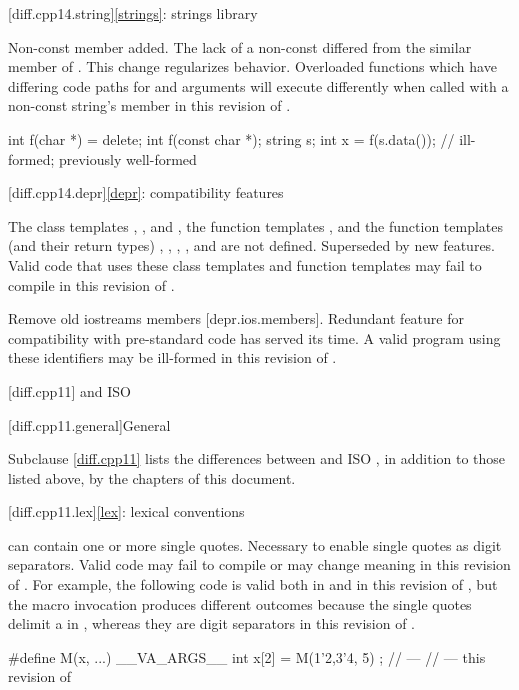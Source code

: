 [diff.cpp14.string]{\ref*{strings}: strings library}

\change
Non-const  member added.
\rationale
The lack of a non-const 
differed from the similar member of .
This change regularizes behavior.
\effect
Overloaded functions which have differing code paths
for  and  arguments
will execute differently
when called with a non-const string's  member
in this revision of \Cpp{}.
\begin{example}
\begin{codeblock}
int f(char *) = delete;
int f(const char *);
string s;
int x = f(s.data());            // ill-formed; previously well-formed
\end{codeblock}
\end{example}

[diff.cpp14.depr]{\ref*{depr}: compatibility features}

\nodiffref
\change
The class templates
,
, and
,
the function templates
,
and the function templates (and their return types)
,
,
,
, and
are not defined.
\rationale
Superseded by new features.
\effect
Valid \CppXIV{} code that uses these class templates
and function templates may fail to compile in this revision of \Cpp{}.

\nodiffref
\change
Remove old iostreams members [depr.ios.members].
\rationale
Redundant feature for compatibility with pre-standard code
has served its time.
\effect
A valid \CppXIV{} program using these identifiers
may be ill-formed in this revision of \Cpp{}.

[diff.cpp11]{\Cpp{} and ISO \CppXI{}}

[diff.cpp11.general]{General}

\pnum
{}%
Subclause \ref{diff.cpp11} lists the differences between \Cpp{} and
ISO \CppXI{},
in addition to those listed above,
by the chapters of this document.

[diff.cpp11.lex]{\ref*{lex}: lexical conventions}

\change
{} can contain one or more single quotes.
\rationale
Necessary to enable single quotes as digit separators.
\effect
Valid \CppXI{} code may fail to compile or may change meaning in this
revision of \Cpp{}. For example, the following code is valid both in \CppXI{} and in
this revision of \Cpp{}, but the macro invocation produces different outcomes
because the single quotes delimit a  in \CppXI{}, whereas they are digit
separators in this revision of \Cpp{}.
\begin{example}
\begin{codeblock}
#define M(x, ...) __VA_ARGS__
int x[2] = { M(1'2,3'4, 5) };
//  --- \CppXI{}
//  --- this revision of \Cpp{}
\end{codeblock}
\end{example}

